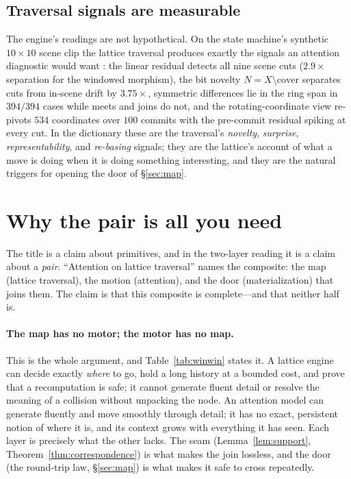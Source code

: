 \documentclass[11pt,a4paper]{article}
\theoremstyle{remark}
\begin{document}
\subsection{Traversal signals are measurable}

The engine's readings are not hypothetical. On the state machine's synthetic
$10\times10$ scene clip the lattice traversal produces exactly the signals an
attention diagnostic would want \cite{state2026}: the linear residual detects
all nine scene cuts ($2.9\times$ separation for the windowed morphism), the bit
novelty $N=X\setminus\mathrm{cover}$ separates cuts from in-scene drift by
$3.75\times$, symmetric differences lie in the ring span in $394/394$ cases
while meets and joins do not, and the rotating-coordinate view re-pivots $534$
coordinates over $100$ commits with the pre-commit residual spiking at every
cut. In the dictionary these are the traversal's \emph{novelty}, \emph{surprise},
\emph{representability}, and \emph{re-basing} signals; they are the lattice's
account of what a move is doing when it is doing something interesting, and
they are the natural triggers for opening the door of \S\ref{sec:map}.

\section{Why the pair is all you need}
\label{sec:all}

The title is a claim about primitives, and in the two-layer reading it is a
claim about a \emph{pair}. ``Attention on lattice traversal'' names the
composite: the map (lattice traversal), the motion (attention), and the door
(materialization) that joins them. The claim is that this composite is
complete---and that neither half is.

\paragraph{The map has no motor; the motor has no map.}
This is the whole argument, and Table~\ref{tab:winwin} states it. A lattice
engine can decide exactly \emph{where} to go, hold a long history at a bounded
cost, and prove that a recomputation is safe; it cannot generate fluent detail
or resolve the meaning of a collision without unpacking the node. An attention
model can generate fluently and move smoothly through detail; it has no exact,
persistent notion of where it is, and its context grows with everything it has
seen. Each layer is precisely what the other lacks. The seam
(Lemma~\ref{lem:support}, Theorem~\ref{thm:correspondence}) is what makes the
join lossless, and the door (the round-trip law, \S\ref{sec:map}) is what makes
it safe to cross repeatedly.
\end{document}
